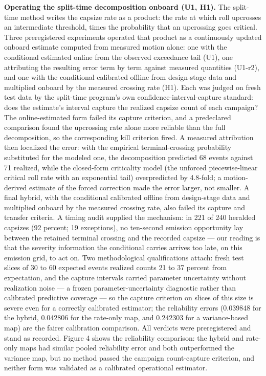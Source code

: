 \documentclass[11pt]{article}
\begin{document}
\textbf{Operating the split-time decomposition onboard (U1, H1).} The split-time method writes the
capsize rate as a product: the rate at which roll upcrosses an intermediate threshold, times
the probability that an upcrossing goes critical. Three preregistered experiments operated that
product as a continuously updated onboard estimate computed from measured motion alone: one
with the conditional estimated online from the observed exceedance tail (U1), one attributing
the resulting error term by term against measured quantities (U1-r2), and one with the
conditional calibrated offline from design-stage data and multiplied onboard by the measured
crossing rate (H1). Each was judged on fresh test data by the split-time program's own
confidence-interval-capture standard: does the estimate's interval capture the realized capsize
count of each campaign? The
online-estimated form failed its capture criterion, and a predeclared comparison found the
upcrossing rate alone more reliable than the full decomposition, so the corresponding kill
criterion fired. A measured attribution then localized the error: with the empirical
terminal-crossing probability substituted for the modeled one, the decomposition predicted 68
events against 71 realized, while the closed-form criticality model (the unforced
piecewise-linear critical roll rate with an exponential tail) overpredicted by 4.8-fold; a
motion-derived estimate of the forced correction made the error larger, not smaller.
A final hybrid, with the conditional calibrated offline from design-stage data and multiplied
onboard by the measured crossing rate, also failed its capture and transfer criteria. A timing
audit supplied the mechanism: in 221 of 240 heralded capsizes (92 percent; 19 exceptions), no
ten-second emission opportunity lay between the retained terminal crossing and the recorded
capsize --- our reading is that the severity information the conditional carries arrives too
late, on this emission grid, to act on. Two methodological
qualifications attach: fresh test slices of 30 to 60 expected events realized counts 21 to 37
percent from expectation, and the capture intervals carried parameter uncertainty without
realization noise --- a frozen parameter-uncertainty diagnostic rather than calibrated predictive
coverage --- so the capture criterion on slices of this size is severe even for a
correctly calibrated estimator; the reliability errors (0.039848 for the hybrid, 0.042806 for the
rate-only map, and 0.242303 for a variance-based map) are the fairer calibration comparison. All
verdicts were preregistered and stand as recorded. Figure 4 shows the reliability comparison:
the hybrid and rate-only maps had similar pooled reliability error and both outperformed the
variance map, but no method passed the campaign count-capture criterion, and neither form was
validated as a calibrated operational estimator.
\end{document}
